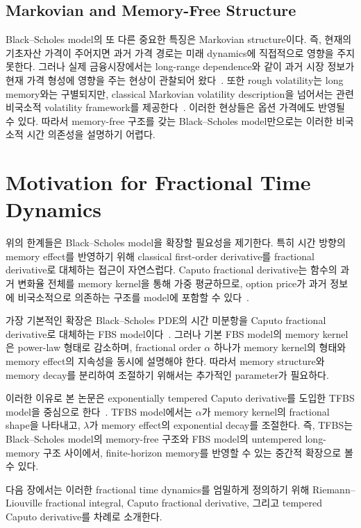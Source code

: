 \documentclass[11pt,a4paper]{report}
\begin{document}
\subsection{Markovian and Memory-Free Structure}

Black--Scholes model의 또 다른 중요한 특징은 Markovian structure이다. 즉, 현재의 기초자산 가격이 주어지면 과거 가격 경로는 미래 dynamics에 직접적으로 영향을 주지 못한다. 그러나 실제 금융시장에서는 long-range dependence와 같이 과거 시장 정보가 현재 가격 형성에 영향을 주는 현상이 관찰되어 왔다~\cite{MandelbrotVanNess1968,ComteRenault1998}. 또한 rough volatility는 long memory와는 구별되지만, classical Markovian volatility description을 넘어서는 관련 비국소적 volatility framework를 제공한다~\cite{GatheralJaissonRosenbaum2018}. 이러한 현상들은 옵션 가격에도 반영될 수 있다. 따라서 memory-free 구조를 갖는 Black--Scholes model만으로는 이러한 비국소적 시간 의존성을 설명하기 어렵다.

\section{Motivation for Fractional Time Dynamics}

위의 한계들은 Black--Scholes model을 확장할 필요성을 제기한다. 특히 시간 방향의 memory effect를 반영하기 위해 classical first-order derivative를 fractional derivative로 대체하는 접근이 자연스럽다. Caputo fractional derivative는 함수의 과거 변화율 전체를 memory kernel을 통해 가중 평균하므로, option price가 과거 정보에 비국소적으로 의존하는 구조를 model에 포함할 수 있다~\cite{Podlubny1999,Caputo1967}.

가장 기본적인 확장은 Black--Scholes PDE의 시간 미분항을 Caputo fractional derivative로 대체하는 FBS model이다~\cite{Wyss2000,Magdziarz2009}. 그러나 기본 FBS model의 memory kernel은 power-law 형태로 감소하며, fractional order $\alpha$ 하나가 memory kernel의 형태와 memory effect의 지속성을 동시에 설명해야 한다. 따라서 memory structure와 memory decay를 분리하여 조절하기 위해서는 추가적인 parameter가 필요하다.

이러한 이유로 본 논문은 exponentially tempered Caputo derivative를 도입한 TFBS model을 중심으로 한다~\cite{SabzikarMeerschaertChen2015}. TFBS model에서는 $\alpha$가 memory kernel의 fractional shape을 나타내고, $\lambda$가 memory effect의 exponential decay를 조절한다. 즉, TFBS는 Black--Scholes model의 memory-free 구조와 FBS model의 untempered long-memory 구조 사이에서, finite-horizon memory를 반영할 수 있는 중간적 확장으로 볼 수 있다.

다음 장에서는 이러한 fractional time dynamics를 엄밀하게 정의하기 위해 Riemann--Liouville fractional integral, Caputo fractional derivative, 그리고 tempered Caputo derivative를 차례로 소개한다.
\end{document}
